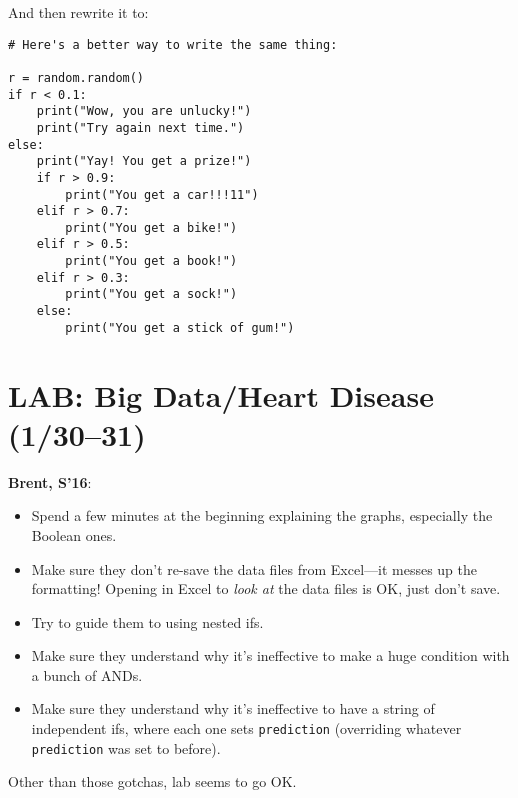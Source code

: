 \documentclass{article}
\newenvironment{reflect}[1]
{
  \noindent
  \begin{lrbox}{\reflectbox}
    \begin{minipage}[t]{\textwidth}
      \textbf{#1}:
}{
    \end{minipage}
  \end{lrbox}
  \fbox{\usebox{\reflectbox}}
}
\newcommand{\ready}{\textcolor{Green}{\Checkmark}\xspace}
\begin{document}
And then rewrite it to:
\begin{verbatim}
# Here's a better way to write the same thing:

r = random.random()
if r < 0.1:
    print("Wow, you are unlucky!")
    print("Try again next time.")
else:
    print("Yay! You get a prize!")
    if r > 0.9:
        print("You get a car!!!11")
    elif r > 0.7:
        print("You get a bike!")
    elif r > 0.5:
        print("You get a book!")
    elif r > 0.3:
        print("You get a sock!")
    else:
        print("You get a stick of gum!")
\end{verbatim}

\newpage
\section*{\ready LAB: Big Data/Heart Disease (1/30--31)}

\begin{reflect}{Brent, S'16}
  \begin{itemize}
  \item Spend a few minutes at the beginning explaining the graphs,
    especially the Boolean ones.
  \item Make sure they don't re-save the data files from Excel---it
    messes up the formatting!  Opening in Excel to \emph{look at} the
    data files is OK, just don't save.
  \item Try to guide them to using nested ifs.
  \item Make sure they understand why it's ineffective to make a huge
    condition with a bunch of ANDs.
  \item Make sure they understand why it's ineffective to have a
    string of independent ifs, where each one sets \texttt{prediction}
    (overriding whatever \texttt{prediction} was set to before).
  \end{itemize}

  Other than those gotchas, lab seems to go OK.
\end{reflect}
\end{document}
